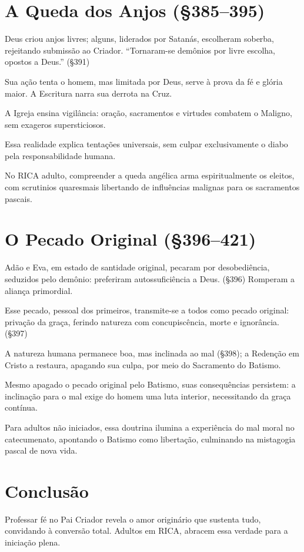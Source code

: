 \section{A Queda dos Anjos (\S 385--395)}

Deus criou anjos livres; alguns, liderados por Satanás, escolheram soberba, rejeitando submissão ao Criador. ``Tornaram-se demônios por livre escolha, opostos a Deus.'' (\S 391)

Sua ação tenta o homem, mas limitada por Deus, serve à prova da fé e glória maior. A Escritura narra sua derrota na Cruz.

A Igreja ensina vigilância: oração, sacramentos e virtudes combatem o Maligno, sem exageros supersticiosos.

Essa realidade explica tentações universais, sem culpar exclusivamente o diabo pela responsabilidade humana.

No RICA adulto, compreender a queda angélica arma espiritualmente os eleitos, com scrutinios quaresmais libertando de influências malignas para os sacramentos pascais.

\section{O Pecado Original (\S 396--421)}

Adão e Eva, em estado de santidade original, pecaram por desobediência, seduzidos pelo demônio: preferiram autossuficiência a Deus. (\S 396) Romperam a aliança primordial.

Esse pecado, pessoal dos primeiros, transmite-se a todos como pecado original: privação da graça, ferindo natureza com concupiscência, morte e ignorância. (\S 397)

A natureza humana permanece boa, mas inclinada ao mal (\S 398); a Redenção em Cristo a restaura, apagando sua culpa, por meio do Sacramento do Batismo.

Mesmo apagado o pecado original pelo Batismo, suas consequências persistem: a inclinação para o mal exige do homem uma luta interior, necessitando da graça contínua.

Para adultos não iniciados, essa doutrina ilumina a experiência do mal moral no catecumenato, apontando o Batismo como libertação, culminando na mistagogia pascal de nova vida.

\section{Conclusão}
Professar fé no Pai Criador revela o amor originário que sustenta tudo, convidando à conversão total. Adultos em RICA, abracem essa verdade para a iniciação plena.
